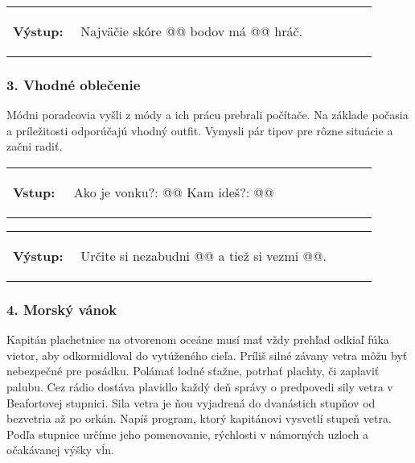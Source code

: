 \vspace{-2em}
\begin{tabular}{@{}p{0.15\linewidth}p{0.75\linewidth}}
\textbf{\small Výstup:} &
\vspace{-3em}
\begin{code}
Najväčie skóre @\fbox{\phantom{vstup}}@ bodov má @\fbox{\phantom{vstup}}@ hráč.
\end{code}
\end{tabular}
\vspace{-2em}


\subsubsection*{3. Vhodné oblečenie}
Módni poradcovia vyšli z módy a ich prácu prebrali počítače. Na základe počasia a príležitosti odporúčajú vhodný outfit. Vymysli pár tipov pre rôzne situácie a začni radiť.

\begin{tabular}{@{}p{0.15\linewidth}p{0.75\linewidth}}
\textbf{\small Vstup:} &
\vspace{-3em}
\begin{code}
Ako je vonku?: @\fbox{\phantom{vstup}}@
Kam ideš?: @\fbox{\phantom{vstup}}@
\end{code}
\end{tabular}

\vspace{-2em}
\begin{tabular}{@{}p{0.15\linewidth}p{0.75\linewidth}}
\textbf{\small Výstup:} &
\vspace{-3em}
\begin{code}
Určite si nezabudni @\fbox{\phantom{vstup}}@ a tiež si vezmi @\fbox{\phantom{vstup}}@.
\end{code}
\end{tabular}
\vspace{-2em}

\subsubsection*{4. Morský vánok}
Kapitán plachetnice na otvorenom oceáne musí mať vždy prehľad odkiaľ fúka vietor, aby odkormidloval do vytúženého cieľa. Príliš silné závany vetra môžu byť nebezpečné pre posádku. Polámať lodné sťažne, potrhať plachty, či zaplaviť palubu. Cez rádio dostáva plavidlo každý deň správy o predpovedi sily vetra v Beafortovej stupnici. Sila vetra je ňou vyjadrená do dvanástich stupňov od bezvetria až po orkán. Napíš program, ktorý kapitánovi vysvetlí stupeň vetra. Podľa stupnice určíme jeho pomenovanie, rýchlosti v námorných uzloch a očakávanej výšky vĺn.

